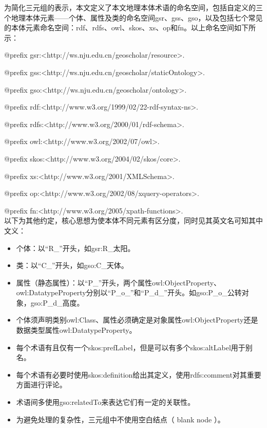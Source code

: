 为简化三元组的表示，本文定义了本文地理本体术语的命名空间，包括自定义的三个地理本体元素——个体、属性及类的命名空间gsr、gss、gso，以及包括七个常见的本体元素命名空间：rdf、rdfs、owl、skos、xs、op和fn。以上命名空间如下所示：


@prefix gsr:\hphantom{sss}<http://ws.nju.edu.cn/geoscholar/resource>.

@prefix gss:\hphantom{sss}<http://ws.nju.edu.cn/geoscholar/staticOntology>.

@prefix gso:\hphantom{ssl}<http://ws.nju.edu.cn/geoscholar/ontology>.

@prefix rdf:\hphantom{sss}<http://www.w3.org/1999/02/22-rdf-syntax-ns>.

@prefix rdfs:\hphantom{ss}<http://www.w3.org/2000/01/rdf-schema>.

@prefix owl:\hphantom{ss}<http://www.w3.org/2002/07/owl>.

@prefix skos:\hphantom{ll}<http://www.w3.org/2004/02/skos/core>.

@prefix xs:\hphantom{sssl}<http://www.w3.org/2001/XMLSchema>.

@prefix op:\hphantom{ssll}<http://www.w3.org/2002/08/xquery-operators>.

@prefix fn:\hphantom{sssl}<http://www.w3.org/2005/xpath-functions>.\linebreak[3]
\\
以下为其他约定，核心思想为使本体不同元素有区分度，同时见其英文名可知其中文义：
\begin{itemize}
	\item {个体：以“R\_”开头，如gsr:R\_太阳。
	}
	\item {类：以“C\_”开头，如gso:C\_天体。
	}
	\item{属性（静态属性）：以“P\_”开头，两个属性owl:ObjectProperty、owl:DatatypeProperty分别以“P\_o\_”和“P\_d\_”开头。如gso:P\_o\_公转对象，gso:P\_d\_高度。
	}
	\item{个体须声明类别owl:Class、属性必须确定是对象属性owl:ObjectProperty还是数据类型属性owl:DatatypeProperty。
	}
	\item{每个术语有且仅有一个skos:prefLabel，但是可以有多个skos:altLabel用于别名。
	}
	\item {每个术语有必要时使用skos:definition给出其定义，使用rdfs:comment对其重要方面进行评论。
	}
	\item {术语间多使用gso:relatedTo来表达它们有一定的关联性。
	}
	\item {为避免处理的复杂性，三元组中不使用空白结点（ blank node ）。
	}
\end{itemize}

